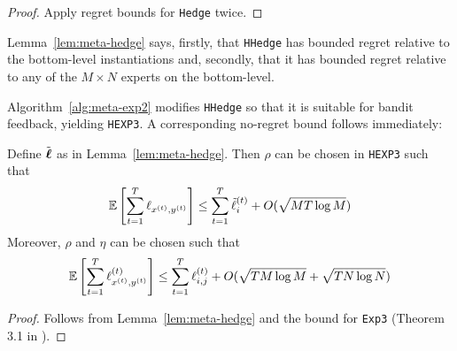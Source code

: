 \begin{proof}
	Apply regret bounds for \texttt{Hedge} twice.
\end{proof}

Lemma~\ref{lem:meta-hedge} says, firstly, that \texttt{HHedge} has bounded regret relative to the bottom-level instantiations and, secondly, that it has bounded regret relative to any of the $M\times N$ experts on the bottom-level.


Algorithm~\ref{alg:meta-exp2} modifies \texttt{HHedge} so that it is suitable for bandit feedback, yielding \texttt{HEXP3}. A corresponding no-regret bound follows immediately:

\begin{lem}\label{lem:meta-exp}
	Define $\tilde{\boldsymbol\ell}$ as in Lemma~\ref{lem:meta-hedge}. Then $\rho$ can be chosen in \texttt{HEXP3} such that
	\begin{equation}
		\operatorname*{\mathbb E}\left[\sum_{t=1}^T\ell_{x^{(t)},y^{(t)}}\right]
		\leq \sum_{t=1}^T \tilde{\ell}^{(t)}_{i}
		+ O(\sqrt{MT\log M})
	\end{equation}
	Moreover, $\rho$ and $\eta$ can be chosen such that
	\begin{equation}
		\operatorname*{\mathbb E}\left[\sum_{t=1}^{T} \ell^{(t)}_{x^{(t)},y^{(t)}}\right]
		\leq \sum_{t=1}^T\ell^{(t)}_{i,j}
		+ O(\sqrt{TM \log M} + \sqrt{T N\log N})
	\end{equation}
\end{lem}
\begin{proof}
	Follows from Lemma~\ref{lem:meta-hedge} and the bound for \texttt{Exp3} (Theorem 3.1 in \cite{auer:02b}).
\end{proof}


